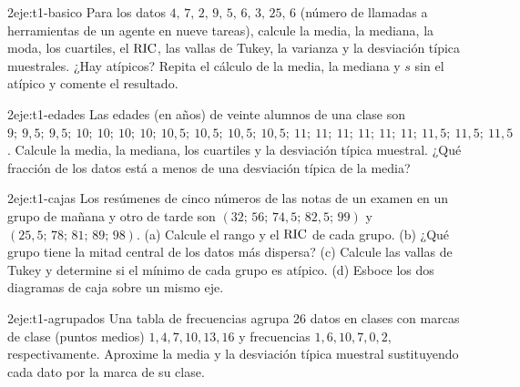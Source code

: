 \begin{ejercicio}{2}{eje:t1-basico}
Para los datos $4,\,7,\,2,\,9,\,5,\,6,\,3,\,25,\,6$ (número de llamadas a herramientas de un agente en nueve tareas), calcule la media, la mediana, la moda, los cuartiles, el $\operatorname{RIC}$, las vallas de Tukey, la varianza y la desviación típica muestrales. ¿Hay atípicos? Repita el cálculo de la media, la mediana y $s$ sin el atípico y comente el resultado.
\end{ejercicio}

\begin{ejercicio}{2}{eje:t1-edades}
Las edades (en años) de veinte alumnos de una clase son
$9;\allowbreak\ 9{,}5;\allowbreak\ 9{,}5;\allowbreak\ 10;\allowbreak\ 10;\allowbreak\ 10;\allowbreak\ 10;\allowbreak\ 10{,}5;\allowbreak\ 10{,}5;\allowbreak\ 10{,}5;\allowbreak\ 10{,}5;\allowbreak\ 11;\allowbreak\ 11;\allowbreak\ 11;\allowbreak\ 11;\allowbreak\ 11;\allowbreak\ 11;\allowbreak\ 11{,}5;\allowbreak\ 11{,}5;\allowbreak\ 11{,}5$.
Calcule la media, la mediana, los cuartiles y la desviación típica muestral. ¿Qué fracción de los datos está a menos de una desviación típica de la media?
\end{ejercicio}

\begin{ejercicio}{2}{eje:t1-cajas}
Los resúmenes de cinco números de las notas de un examen en un grupo de mañana y otro de tarde son $(32;\allowbreak\,56;\allowbreak\,74{,}5;\allowbreak\,82{,}5;\allowbreak\,99)$ y $(25{,}5;\allowbreak\,78;\allowbreak\,81;\allowbreak\,89;\allowbreak\,98)$. (a) Calcule el rango y el $\operatorname{RIC}$ de cada grupo. (b) ¿Qué grupo tiene la mitad central de los datos más dispersa? (c) Calcule las vallas de Tukey y determine si el mínimo de cada grupo es atípico. (d) Esboce los dos diagramas de caja sobre un mismo eje.
\end{ejercicio}

\begin{ejercicio}{2}{eje:t1-agrupados}
Una tabla de frecuencias agrupa 26 datos en clases con marcas de clase (puntos medios) $1,4,7,10,13,16$ y frecuencias $1,6,10,7,0,2$, respectivamente. Aproxime la media y la desviación típica muestral sustituyendo cada dato por la marca de su clase.
\end{ejercicio}

